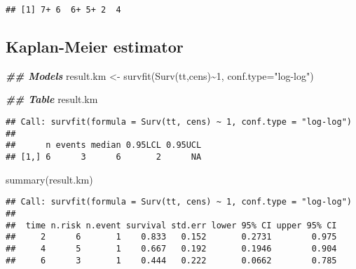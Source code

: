 \documentclass[
]{book}
\newenvironment{Shaded}{\begin{snugshade}}{\end{snugshade}}
\newcommand{\AttributeTok}[1]{\textcolor[rgb]{0.77,0.63,0.00}{#1}}
\newcommand{\DecValTok}[1]{\textcolor[rgb]{0.00,0.00,0.81}{#1}}
\newcommand{\DocumentationTok}[1]{\textcolor[rgb]{0.56,0.35,0.01}{\textbf{\textit{#1}}}}
\newcommand{\FunctionTok}[1]{\textcolor[rgb]{0.00,0.00,0.00}{#1}}
\newcommand{\NormalTok}[1]{#1}
\newcommand{\OtherTok}[1]{\textcolor[rgb]{0.56,0.35,0.01}{#1}}
\newcommand{\SpecialCharTok}[1]{\textcolor[rgb]{0.00,0.00,0.00}{#1}}
\newcommand{\StringTok}[1]{\textcolor[rgb]{0.31,0.60,0.02}{#1}}
\begin{document}
\begin{verbatim}
## [1] 7+ 6  6+ 5+ 2  4
\end{verbatim}

\hypertarget{kaplan-meier-estimator}{%
\subsection{Kaplan-Meier estimator}\label{kaplan-meier-estimator}}

\begin{Shaded}
\begin{Highlighting}[]
\DocumentationTok{\#\# Models}
\NormalTok{result.km }\OtherTok{\textless{}{-}} \FunctionTok{survfit}\NormalTok{(}\FunctionTok{Surv}\NormalTok{(tt,cens)}\SpecialCharTok{\textasciitilde{}}\DecValTok{1}\NormalTok{,}
                     \AttributeTok{conf.type=}\StringTok{"log{-}log"}\NormalTok{)}

\DocumentationTok{\#\# Table}
\NormalTok{result.km}
\end{Highlighting}
\end{Shaded}

\begin{verbatim}
## Call: survfit(formula = Surv(tt, cens) ~ 1, conf.type = "log-log")
## 
##      n events median 0.95LCL 0.95UCL
## [1,] 6      3      6       2      NA
\end{verbatim}

\begin{Shaded}
\begin{Highlighting}[]
\FunctionTok{summary}\NormalTok{(result.km)}
\end{Highlighting}
\end{Shaded}

\begin{verbatim}
## Call: survfit(formula = Surv(tt, cens) ~ 1, conf.type = "log-log")
## 
##  time n.risk n.event survival std.err lower 95% CI upper 95% CI
##     2      6       1    0.833   0.152       0.2731        0.975
##     4      5       1    0.667   0.192       0.1946        0.904
##     6      3       1    0.444   0.222       0.0662        0.785
\end{verbatim}
\end{document}
